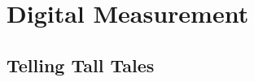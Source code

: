 \chapter{Digital Measurement}\label{c:measure}
\section{Telling Tall Tales}

\printglossary[type=measure]
\glsresetall  
